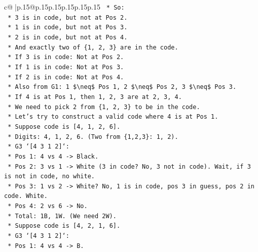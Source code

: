 \documentclass{article}
\begin{document}
{\begin{supertabular}{c@{$\;$}|p{.15\linewidth}@{}p{.15\linewidth}p{.15\linewidth}p{.15\linewidth}p{.15\linewidth}p{.15\linewidth}}
{{{\texttt{            *   So:} \\
\texttt{                *   3 is in code, but not at Pos 2.} \\
\texttt{                *   1 is in code, but not at Pos 3.} \\
\texttt{                *   2 is in code, but not at Pos 4.} \\
\texttt{            *   And exactly two of \{1, 2, 3\} are in the code.} \\
\texttt{            *   If 3 is in code: Not at Pos 2.} \\
\texttt{            *   If 1 is in code: Not at Pos 3.} \\
\texttt{            *   If 2 is in code: Not at Pos 4.} \\
\texttt{            *   Also from G1: 1 \$\textbackslash{}neq\$ Pos 1, 2 \$\textbackslash{}neq\$ Pos 2, 3 \$\textbackslash{}neq\$ Pos 3.} \\
\texttt{            *   If 4 is at Pos 1, then 1, 2, 3 are at 2, 3, 4.} \\
\texttt{            *   We need to pick 2 from \{1, 2, 3\} to be in the code.} \\
\texttt{            *   Let's try to construct a valid code where 4 is at Pos 1.} \\
\texttt{                *   Suppose code is {[}4, 1, 2, 6{]}.} \\
\texttt{                    *   Digits: 4, 1, 2, 6. (Two from \{1,2,3\}: 1, 2).} \\
\texttt{                    *   G3 `{[}4 3 1 2{]}`:} \\
\texttt{                        *   Pos 1: 4 vs 4 {-}> Black.} \\
\texttt{                        *   Pos 2: 3 vs 1 {-}> White (3 in code? No, 3 not in code). Wait, if 3 is not in code, no white.} \\
\texttt{                        *   Pos 3: 1 vs 2 {-}> White? No, 1 is in code, pos 3 in guess, pos 2 in code. White.} \\
\texttt{                        *   Pos 4: 2 vs 6 {-}> No.} \\
\texttt{                        *   Total: 1B, 1W. (We need 2W).} \\
\texttt{                *   Suppose code is {[}4, 2, 1, 6{]}.} \\
\texttt{                    *   G3 `{[}4 3 1 2{]}`:} \\
\texttt{                        *   Pos 1: 4 vs 4 {-}> B.} \\
}}}
\end{supertabular}}
\end{document}
